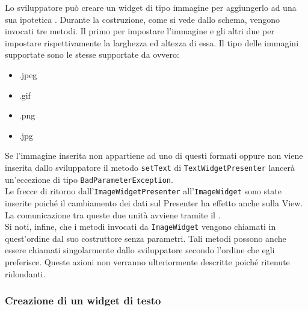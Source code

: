 Lo sviluppatore può creare un widget di tipo immagine per aggiungerlo ad una sua ipotetica . Durante la costruzione, come si vede dallo schema, vengono invocati tre metodi. Il primo per impostare l'immagine e gli altri due per impostare rispettivamente la larghezza ed altezza di essa. Il tipo delle immagini supportate sono le stesse supportate da  ovvero:
\begin{itemize}
\item .jpeg
\item .gif
\item .png
\item .jpg
\end{itemize}
Se l'immagine inserita non appartiene ad uno di questi formati oppure non viene inserita dallo sviluppatore il metodo \texttt{setText} di \texttt{TextWidgetPresenter} lancerà un'eccezione di tipo \texttt{BadParameterException}. \\
Le frecce di ritorno dall'\texttt{ImageWidgetPresenter} all'\texttt{ImageWidget} sono state inserite poiché il cambiamento dei dati sul Presenter ha effetto anche sulla View. La comunicazione tra queste due unità avviene tramite il  . \\
Si noti, infine, che i metodi invocati da \texttt{ImageWidget} vengono chiamati in quest'ordine dal suo costruttore senza parametri. Tali metodi possono anche essere chiamati singolarmente dallo sviluppatore secondo l'ordine che egli preferisce. Queste azioni non verranno ulteriormente descritte poiché ritenute ridondanti.

\newpage

\subsubsection{Creazione di un widget di testo}

